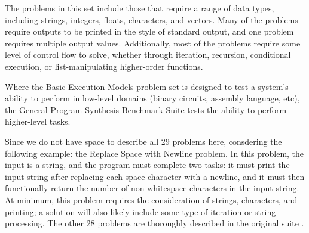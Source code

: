 The problems in this set include those that require a range of data types, including strings, integers, floats, characters, and vectors. Many of the problems require outputs to be printed in the style of standard output, and one problem requires multiple output values. Additionally, most of the problems require some level of control flow to solve, whether through iteration, recursion, conditional execution, or list-manipulating higher-order functions.

Where the Basic Execution Models problem set is designed to test a system's ability to perform in low-level domains (binary circuits, assembly language, etc), the General Program Synthesis Benchmark Suite tests the ability to perform higher-level tasks.

Since we do not have space to describe all 29 problems here, consdering the following example: the Replace Space with Newline problem. In this problem, the input is a string, and the program must complete two tasks: it must print the input string after replacing each space character with a newline, and it must then functionally return the number of non-whitespace characters in the input string. At minimum, this problem requires the consideration of strings, characters, and printing; a solution will also likely include some type of iteration or string processing. The other 28 problems are thoroughly described in the original suite \cite{Helmuth2015b}.

